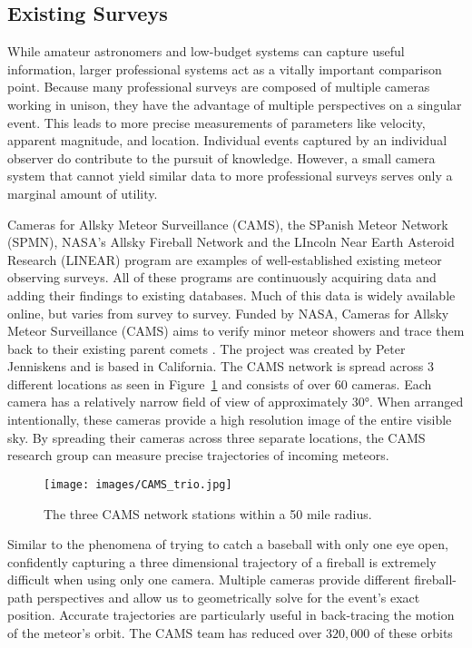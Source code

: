\subsection{Existing Surveys}
While amateur astronomers and low-budget systems can capture useful information, larger professional systems act as a vitally important comparison point.
Because many professional surveys are composed of multiple cameras working in unison, they have the advantage of multiple perspectives on a singular event.
This leads to more precise measurements of parameters like velocity, apparent magnitude, and location.
Individual events captured by an individual observer do contribute to the pursuit of knowledge.
However, a small camera system that cannot yield similar data to more professional surveys serves only a marginal amount of utility.

Cameras for Allsky Meteor Surveillance (CAMS), the SPanish Meteor Network (SPMN), NASA's Allsky Fireball Network and the LIncoln Near Earth Asteroid Research (LINEAR) program are examples of well-established existing meteor observing surveys.
All of these programs are continuously acquiring data and adding their findings to existing databases.  
Much of this data is widely available online, but varies from survey to survey.
Funded by NASA, Cameras for Allsky Meteor Surveillance (CAMS) aims to verify minor meteor showers and trace them back to their existing parent comets \cite{jenniskens_cams:_2011}.  
The project was created by Peter Jenniskens and is based in California.  
The CAMS network is spread across 3 different locations as seen in Figure~\ref{trio} and consists of over 60 cameras.
Each camera has a relatively narrow field of view of approximately \ang{30}.
When arranged intentionally, these cameras provide a high resolution image of the entire visible sky.
By spreading their cameras across three separate locations, the CAMS research group can measure precise trajectories of incoming meteors. 

\begin{figure}[ht!]
  \centering
  \texttt{[image: images/CAMS\_trio.jpg]}
  \caption{The three CAMS network stations within a 50 mile radius.}
  \label{trio}
\end{figure}

Similar to the phenomena of trying to catch a baseball with only one eye open, confidently capturing a three dimensional trajectory of a fireball is extremely difficult when using only one camera.
Multiple cameras provide different fireball-path perspectives and allow us to geometrically solve for the event's exact position.
Accurate trajectories are particularly useful in back-tracing the motion of the meteor's orbit.  
The CAMS team has reduced over $320,000$ of these orbits \cite{peter_jenniskens_cameras_2018}


